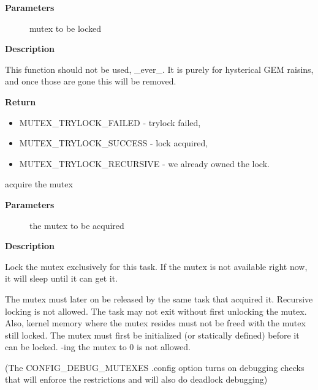 \documentclass[a4paper,8pt,english]{sphinxmanual}
\begin{document}
\textbf{Parameters}
\begin{description}
\item[{}] \leavevmode
mutex to be locked

\end{description}

\textbf{Description}

This function should not be used, \_ever\_. It is purely for hysterical GEM
raisins, and once those are gone this will be removed.

\textbf{Return}
\begin{itemize}
\item {} 
MUTEX\_TRYLOCK\_FAILED    - trylock failed,

\item {} 
MUTEX\_TRYLOCK\_SUCCESS   - lock acquired,

\item {} 
MUTEX\_TRYLOCK\_RECURSIVE - we already owned the lock.

\end{itemize}

\begin{fulllineitems}
\label{kernel-hacking/locking:c.mutex_lock}
acquire the mutex

\end{fulllineitems}


\textbf{Parameters}
\begin{description}
\item[{}] \leavevmode
the mutex to be acquired

\end{description}

\textbf{Description}

Lock the mutex exclusively for this task. If the mutex is not
available right now, it will sleep until it can get it.

The mutex must later on be released by the same task that
acquired it. Recursive locking is not allowed. The task
may not exit without first unlocking the mutex. Also, kernel
memory where the mutex resides must not be freed with
the mutex still locked. The mutex must first be initialized
(or statically defined) before it can be locked. -ing
the mutex to 0 is not allowed.

(The CONFIG\_DEBUG\_MUTEXES .config option turns on debugging
checks that will enforce the restrictions and will also do
deadlock debugging)
\end{document}

